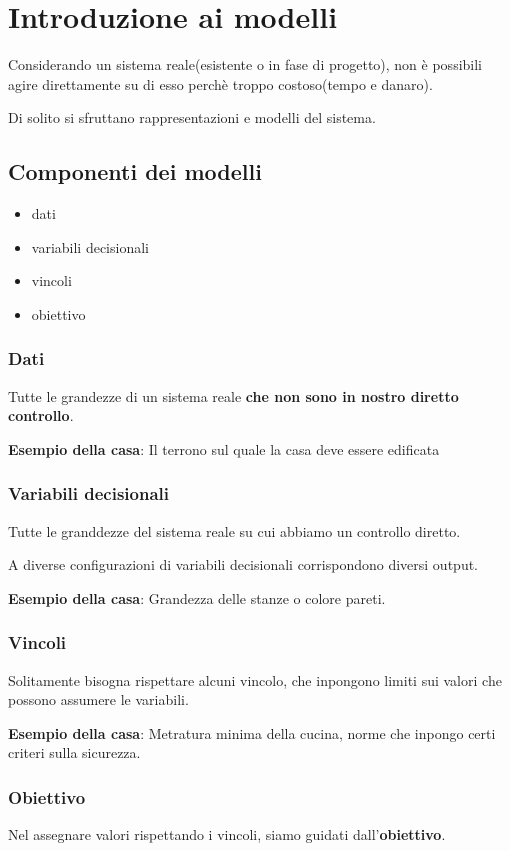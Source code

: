 \section{Introduzione ai modelli}
Considerando un sistema reale(esistente o in fase di progetto),
non è possibili agire direttamente su di esso perchè troppo costoso(tempo e danaro).

Di solito si sfruttano rappresentazioni e modelli del sistema.

\subsection{Componenti dei modelli}
\begin{itemize}
    \item dati
    \item variabili decisionali
    \item vincoli
    \item obiettivo
\end{itemize}

\subsubsection{Dati}
Tutte le grandezze di un sistema reale \textbf{che non sono in nostro diretto controllo}.

\textbf{Esempio della casa}:
Il terrono sul quale la casa deve essere edificata

\subsubsection{Variabili decisionali}
Tutte le granddezze del sistema reale su cui abbiamo un controllo diretto.

A diverse configurazioni di variabili decisionali corrispondono diversi output.

\textbf{Esempio della casa}:
Grandezza delle stanze o colore pareti.

\subsubsection{Vincoli}
Solitamente bisogna rispettare alcuni vincolo, 
che inpongono limiti sui valori che possono assumere 
le variabili.

\textbf{Esempio della casa}:
Metratura minima della cucina, norme che inpongo certi criteri sulla sicurezza.

\subsubsection{Obiettivo}
Nel assegnare valori rispettando i vincoli, siamo guidati dall'\textbf{obiettivo}.

